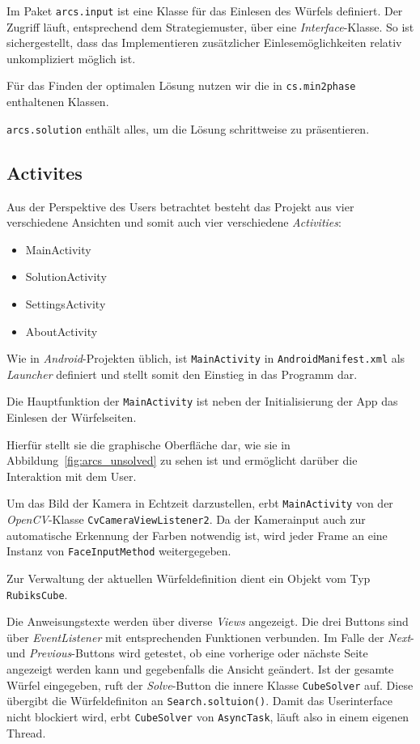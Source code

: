 Im Paket \texttt{arcs.input} ist eine Klasse für das Einlesen des Würfels
definiert. Der Zugriff läuft, entsprechend dem Strategiemuster, über eine
\emph{Interface}-Klasse. So ist sichergestellt, dass das Implementieren
zusätzlicher Einlesemöglichkeiten relativ unkompliziert möglich ist.

Für das Finden der optimalen Lösung nutzen wir die in \texttt{cs.min2phase}
enthaltenen Klassen.

\texttt{arcs.solution} enthält alles, um die Lösung schrittweise zu
präsentieren.

\subsection{Activites}

Aus der Perspektive des Users betrachtet besteht das Projekt aus vier
verschiedene Ansichten und somit auch vier verschiedene \emph{Activities}:

\begin{itemize}
  \item MainActivity
  \item SolutionActivity
  \item SettingsActivity
  \item AboutActivity
\end{itemize}

Wie in \emph{Android}-Projekten üblich, ist \texttt{MainActivity} in
\texttt{AndroidManifest.xml} als \emph{Launcher} definiert und stellt somit den
Einstieg in das Programm dar.

Die Hauptfunktion der \texttt{MainActivity} ist neben der Initialisierung der
App das Einlesen der Würfelseiten.

Hierfür stellt sie die graphische Oberfläche dar, wie sie in
Abbildung~\ref{fig:arcs_unsolved} zu sehen ist und ermöglicht darüber die
Interaktion mit dem User.

Um das Bild der Kamera in Echtzeit darzustellen, erbt \texttt{MainActivity} von
der \emph{OpenCV}-Klasse \texttt{CvCameraViewListener2}. Da der Kamerainput auch
zur automatische Erkennung der Farben notwendig ist, wird jeder Frame an eine
Instanz von \texttt{FaceInputMethod} weitergegeben.

Zur Verwaltung der aktuellen Würfeldefinition dient ein Objekt vom Typ
\texttt{RubiksCube}.

Die Anweisungstexte werden über diverse \emph{Views} angezeigt. Die drei Buttons
sind über \emph{EventListener} mit entsprechenden Funktionen verbunden. Im Falle
der \emph{Next}- und \emph{Previous}-Buttons wird getestet, ob eine vorherige
oder nächste Seite angezeigt werden kann und gegebenfalls die Ansicht geändert.
Ist der gesamte Würfel eingegeben, ruft der \emph{Solve}-Button die innere
Klasse \texttt{CubeSolver} auf. Diese übergibt die Würfeldefiniton an
\texttt{Search.soltuion()}. Damit das Userinterface nicht blockiert wird, erbt
\texttt{CubeSolver} von \texttt{AsyncTask}, läuft also in einem eigenen Thread.


